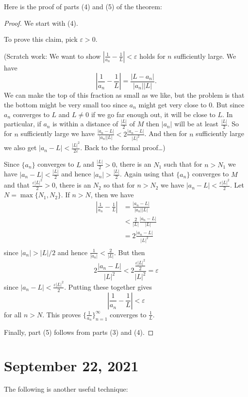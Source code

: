 \documentclass[12pt]{amsart}
\def\e{\varepsilon}
\numberwithin{equation}{section}
\theoremstyle{plain} %
\newcommand{\Sept}[1]{\section{September #1, 2021}}
\theoremstyle{definition}
\theoremstyle{remark}
\begin{document}
Here is the proof of parts (4) and (5) of the theorem:
\begin{proof}
We start with (4).

To prove this claim,  pick $\e > 0$. 
	
	(Scratch work: We want to show $\left|\frac{1}{a_n} -
	\frac{1}{L}\right| < \e$ holds for $n$ sufficiently large.  
	We have
	$$
	\left|\frac{1}{a_n} - \frac{1}{L}\right| = \frac{|L - a_n|}{|a_n||L|}.
	$$ 
	We can make the top of this fraction as small as we like, but the problem is that the
	bottom might be very small too since $a_n$ might get very close to $0$. But since $a_n$ converges to $L$ and $L \ne 0$ if we go far enough out, it will be
	close to $L$. In particular, if $a_n$ is within a distance of
	$\frac{|L|}{2}$ of $M$ then $|a_n|$ will be at least
	$\frac{|L|}{2}$. So for $n$ sufficiently large we have
	$\frac{|a_n-L|}{|a_n||L|} < 2 \frac{|a_n-L|}{|L|^2}$. And then for $n$
	sufficiently large we also get $|a_n - L| < \frac{|L|^2}{2 \e}$.  Back to the formal proof\dots)
	
	
	
	Since $\{a_n\}$ converges to $L$ and $\frac{|L|}{2} > 0$, there is an $N_1$ such that for $n > N_1$ we have $|a_n - L| < \frac{|L|}{2}$  and hence
	$|a_n| > \frac{|L|}{2}$. Again using that $\{a_n\}$ converges to $M$
	and that $\frac{ \e |L|^2}{2} > 0$, there is an $N_2$ so that for $n > N_2$ we have
	$|a_n - L| < \frac{ \e |L|^2}{2}$. Let $N = \max\{N_1, N_2\}$. If $n > N$, then we have
	$$
	\begin{aligned}
	\left|\frac{1}{a_n} - \frac{1}{L}\right| & = \frac{|a_n - L|}{|a_n||L|} \\
	& < \frac{2}{|L|}  \frac{|a_n - L|}{|L|} \\
	& = 2 \frac{|a_n - L|}{|L|^2} \\
	\end{aligned}
	$$
	since $|a_n| > |L|/2$ and hence $\frac{1}{|a_n|} < \frac{2}{|L|}$.
	But then
	$$
	2 \frac{|a_n - L|}{|L|^2}  < 2 \frac{\frac{\e |L|^2}{2}}{|L|^2} = \e
	$$
	since $|a_n - L| < \frac{ \e |L|^2}{2}$. Putting these together gives
	$$
	\left|\frac{1}{a_n} - \frac{1}{L}\right| < \e
	$$
	for all $n > N$. 
	This proves $\{\frac{1}{a_n}\}_{n=1}^\infty$ converges to $\frac{1}{L}$.

Finally, part (5) follows from parts (3) and (4).
\end{proof}


\Sept{22}


The following is another useful technique:
\end{document}
